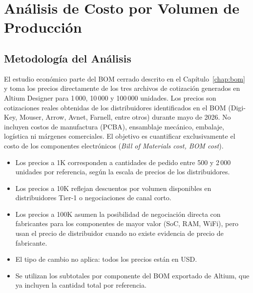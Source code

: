 \chapter{Análisis de Costo por Volumen de Producción}
\label{chap:costos}

\section{Metodología del Análisis}
\label{sec:cost_metodologia}

El estudio económico parte del BOM cerrado descrito en el
Capítulo~\ref{chap:bom} y toma los precios directamente de los tres
archivos de cotización generados en Altium Designer para 1\,000,
10\,000 y 100\,000 unidades. Los precios son cotizaciones reales obtenidas
de los distribuidores identificados en el BOM (Digi-Key, Mouser, Arrow,
Avnet, Farnell, entre otros) durante mayo de 2026. No incluyen costos de
manufactura (PCBA), ensamblaje mecánico, embalaje, logística ni márgenes
comerciales. El objetivo es cuantificar exclusivamente el costo de los
componentes electrónicos (\emph{Bill of Materials cost, BOM cost}).

\begin{infobox}
  \begin{itemize}
    \item Los precios a 1K corresponden a cantidades de pedido entre 500 y
      2\,000 unidades por referencia, según la escala de precios de los
      distribuidores.
    \item Los precios a 10K reflejan descuentos por volumen disponibles en
      distribuidores Tier-1 o negociaciones de canal corto.
    \item Los precios a 100K asumen la posibilidad de negociación directa
      con fabricantes para los componentes de mayor valor (SoC, RAM, WiFi),
      pero usan el precio de distribuidor cuando no existe evidencia de
      precio de fabricante.
    \item El tipo de cambio no aplica: todos los precios están en USD.
    \item Se utilizan los subtotales por componente del BOM exportado de
      Altium, que ya incluyen la cantidad total por referencia.
  \end{itemize}
\end{infobox}

